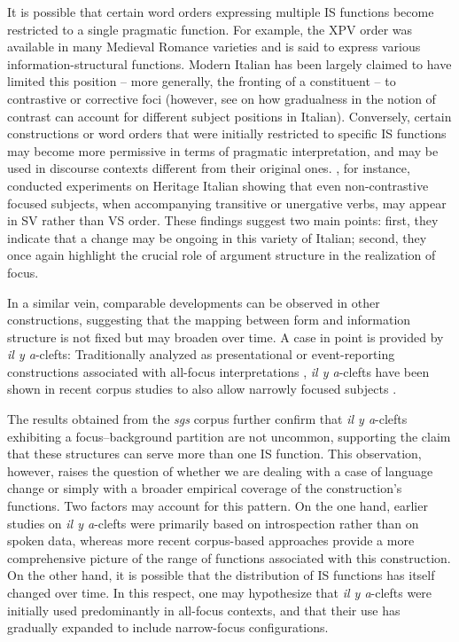 It is possible that certain word orders expressing multiple IS functions become restricted to a single pragmatic function. For example, the XPV order was available in many Medieval Romance varieties and is said to express various information-structural functions. Modern Italian has been largely claimed to have limited this position -- more generally, the fronting of a constituent -- to contrastive or corrective foci (however, see \cite{cruschina2021} on how gradualness in the notion of contrast can account for different subject positions in Italian). Conversely, certain constructions or word orders that were initially restricted to specific IS functions may become more permissive in terms of pragmatic interpretation, and may be used in discourse contexts different from their original ones. \textcite{caloi2018answering}, for instance, conducted experiments on Heritage Italian showing that even non-contrastive focused subjects, when accompanying transitive or unergative verbs, may appear in SV rather than VS order. These findings suggest two main points: first, they indicate that a change may be ongoing in this variety of Italian; second, they once again highlight the crucial role of argument structure in the realization of focus. 

In a similar vein, comparable developments can be observed in other constructions, suggesting that the mapping between form and information structure is not fixed but may broaden over time. A case in point is provided by
\textit{il y a}-clefts: Traditionally analyzed as presentational or event-reporting constructions associated with all-focus interpretations \parencite{lambrecht1996information}, \textit{il y a}-clefts have been shown in recent corpus studies to also allow narrowly focused subjects \parencite{karssenberg2017oiseaux, Karssenberg+2018}. 

The results obtained from the \textit{sgs} corpus further confirm that \textit{il y a}-clefts exhibiting a focus–background partition are not uncommon, supporting the claim that these structures can serve more than one IS function. This observation, however, raises the question of whether we are dealing with a case of language change or simply with a broader empirical coverage of the construction’s functions.
Two factors may account for this pattern. On the one hand, earlier studies on \textit{il y a}-clefts were primarily based on introspection rather than on spoken data, whereas more recent corpus-based approaches provide a more comprehensive picture of the range of functions associated with this construction. On the other hand, it is possible that the distribution of IS functions has itself changed over time. In this respect, one may hypothesize that \textit{il y a}-clefts were initially used predominantly in all-focus contexts, and that their use has gradually expanded to include narrow-focus configurations.

